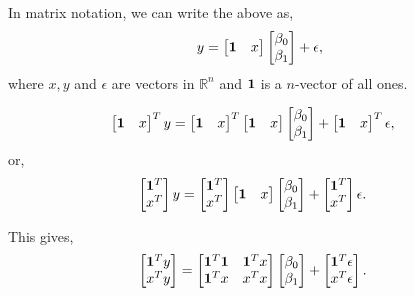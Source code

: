 \documentclass{amsart}
\theoremstyle{plain}
\numberwithin{equation}{section}
\begin{document}
In matrix notation, we can write the above as,
\begin{align*}
y = \begin{bmatrix}
{\bf 1} & x
\end{bmatrix}
\begin{bmatrix}
\beta_0\\
\beta_1
\end{bmatrix} + \epsilon,
\end{align*}
where $x, y$ and $\epsilon$ are vectors in $\mathbb{R}^n$ and 
${\bf 1}$ is a $n$-vector of all ones.

\begin{align*}
\begin{bmatrix}
{\bf 1} & x
\end{bmatrix}^T
y &= 
\begin{bmatrix}
{\bf 1} & x
\end{bmatrix}^T
\begin{bmatrix}
{\bf 1} & x
\end{bmatrix}
\begin{bmatrix}
\beta_0\\
\beta_1
\end{bmatrix} + 
\begin{bmatrix}
{\bf 1} & x
\end{bmatrix}^T\epsilon,
\end{align*}
or,
\begin{align*}
\begin{bmatrix}
{\bf 1}^T\\
x^T
\end{bmatrix}
y &= 
\begin{bmatrix}
{\bf 1}^T\\
x^T
\end{bmatrix}
\begin{bmatrix}
{\bf 1} & x
\end{bmatrix}
\begin{bmatrix}
\beta_0\\
\beta_1
\end{bmatrix} + 
\begin{bmatrix}
{\bf 1}^T\\
x^T
\end{bmatrix}\epsilon.
\end{align*}

This gives,
\begin{align*}
\begin{bmatrix}
{\bf 1}^Ty\\
x^Ty
\end{bmatrix}
&= 
\begin{bmatrix}
{\bf 1}^T{\bf 1} & {\bf 1}^Tx\\
{\bf 1}^Tx & x^Tx
\end{bmatrix}
\begin{bmatrix}
\beta_0\\
\beta_1
\end{bmatrix} + 
\begin{bmatrix}
{\bf 1}^T \epsilon\\
x^T\epsilon
\end{bmatrix}.
\end{align*}
\end{document}
